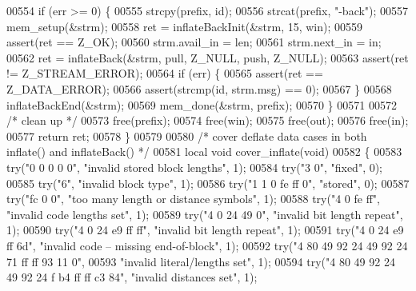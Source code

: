 \begin{DoxyCode}
{{{{{00554     \textcolor{keywordflow}{if} (err >= 0) \{
00555         strcpy(prefix, \textcolor{keywordtype}{id});
00556         strcat(prefix, \textcolor{stringliteral}{"-back"});
00557         mem\_setup(&strm);
00558         ret = inflateBackInit(&strm, 15, win);
00559         assert(ret == Z\_OK);
00560         strm.avail\_in = len;
00561         strm.next\_in = in;
00562         ret = inflateBack(&strm, pull, Z\_NULL, push, Z\_NULL);
00563         assert(ret != Z\_STREAM\_ERROR);
00564         \textcolor{keywordflow}{if} (err) \{
00565             assert(ret == Z\_DATA\_ERROR);
00566             assert(strcmp(\textcolor{keywordtype}{id}, strm.msg) == 0);
00567         \}
00568         inflateBackEnd(&strm);
00569         mem\_done(&strm, prefix);
00570     \}
00571 
00572     \textcolor{comment}{/* clean up */}
00573     free(prefix);
00574     free(win);
00575     free(out);
00576     free(in);
00577     \textcolor{keywordflow}{return} ret;
00578 \}
00579 
00580 \textcolor{comment}{/* cover deflate data cases in both inflate() and inflateBack() */}
00581 local \textcolor{keywordtype}{void} cover\_inflate(\textcolor{keywordtype}{void})
00582 \{
00583     \textcolor{keywordflow}{try}(\textcolor{stringliteral}{"0 0 0 0 0"}, \textcolor{stringliteral}{"invalid stored block lengths"}, 1);
00584     \textcolor{keywordflow}{try}(\textcolor{stringliteral}{"3 0"}, \textcolor{stringliteral}{"fixed"}, 0);
00585     \textcolor{keywordflow}{try}(\textcolor{stringliteral}{"6"}, \textcolor{stringliteral}{"invalid block type"}, 1);
00586     \textcolor{keywordflow}{try}(\textcolor{stringliteral}{"1 1 0 fe ff 0"}, \textcolor{stringliteral}{"stored"}, 0);
00587     \textcolor{keywordflow}{try}(\textcolor{stringliteral}{"fc 0 0"}, \textcolor{stringliteral}{"too many length or distance symbols"}, 1);
00588     \textcolor{keywordflow}{try}(\textcolor{stringliteral}{"4 0 fe ff"}, \textcolor{stringliteral}{"invalid code lengths set"}, 1);
00589     \textcolor{keywordflow}{try}(\textcolor{stringliteral}{"4 0 24 49 0"}, \textcolor{stringliteral}{"invalid bit length repeat"}, 1);
00590     \textcolor{keywordflow}{try}(\textcolor{stringliteral}{"4 0 24 e9 ff ff"}, \textcolor{stringliteral}{"invalid bit length repeat"}, 1);
00591     \textcolor{keywordflow}{try}(\textcolor{stringliteral}{"4 0 24 e9 ff 6d"}, \textcolor{stringliteral}{"invalid code -- missing end-of-block"}, 1);
00592     \textcolor{keywordflow}{try}(\textcolor{stringliteral}{"4 80 49 92 24 49 92 24 71 ff ff 93 11 0"},
00593         \textcolor{stringliteral}{"invalid literal/lengths set"}, 1);
00594     \textcolor{keywordflow}{try}(\textcolor{stringliteral}{"4 80 49 92 24 49 92 24 f b4 ff ff c3 84"}, \textcolor{stringliteral}{"invalid distances set"}, 1);
}}}}}
\end{DoxyCode}
